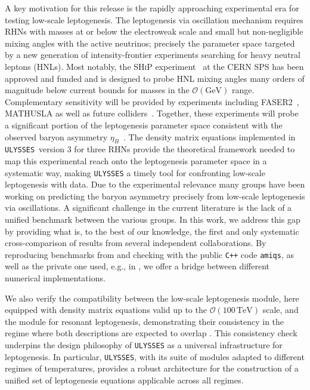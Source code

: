 \documentclass[12pt, a4paper]{article}
\begin{document}
A key motivation for this release is the rapidly approaching experimental era for 
testing low-scale leptogenesis. The
leptogenesis via oscillation mechanism
 requires RHNs with masses at or below the electroweak scale and 
small but non-negligible mixing angles with the active neutrinos; precisely the 
parameter space targeted by a new generation of intensity-frontier experiments searching 
for heavy neutral leptons (HNLs). Most notably, the \textsc{SHiP} experiment~\cite{Alekhin:2015byh} at the CERN SPS has been approved and funded and is designed to probe HNL mixing 
angles many orders of magnitude below current bounds for masses in the $\mathcal{O}
(\text{GeV})$ range. Complementary sensitivity will be provided by experiments including 
\textsc{FASER2}~\cite{Kling:2018wct, Feng:2017uoz}, MATHUSLA \cite{Curtin:2018mvb} as well as future 
colliders~\cite{Mekala:2022cmm,Blondel:2022qqo,Wang:2019xvx,Boyarsky:2022epg}. Together, these experiments will probe a significant portion of the leptogenesis 
parameter space consistent with the observed baryon asymmetry $\eta_B$~\cite{Drewes:2024bla
}. The density matrix equations implemented in \texttt{ULYSSES}~version 3 for three RHNs 
provide the theoretical framework needed to map this experimental reach onto the 
leptogenesis parameter space in a systematic way, making 
\texttt{ULYSSES} a timely tool for confronting low-scale leptogenesis with data.
Due to the experimental relevance many groups have been working on predicting the baryon asymmetry precisely from
low-scale leptogenesis via oscillations. 
A significant challenge in the current literature is the lack of a unified benchmark between the various groups. In this work, we address this gap by providing what is, to the best of our knowledge, the first and only systematic cross-comparison of results from several independent collaborations. By reproducing benchmarks from \cite{Hernandez:2022ivz, Abada:2018oly} and checking with the public \texttt{C++} code \texttt{amiqs}, as well as the private one used, e.g., in \cite{Drewes:2021nqr}, we offer a bridge between different numerical implementations. 

We also verify the compatibility between the low-scale leptogenesis module, here equipped with density matrix equations valid up to the $\mathcal{O}(100\,\mathrm{TeV})$ scale, and the module for resonant leptogenesis, demonstrating their consistency in the regime where both descriptions are expected to overlap \cite{Klaric:2020phc, Klaric:2021cpi}. This consistency check underpins the design philosophy of \texttt{ULYSSES} as a universal infrastructure for leptogenesis. In particular, \texttt{ULYSSES}, with its suite of modules adapted to different regimes of temperatures,
provides a robust architecture for the construction of a unified set of leptogenesis equations applicable across all regimes.
 
\end{document}
